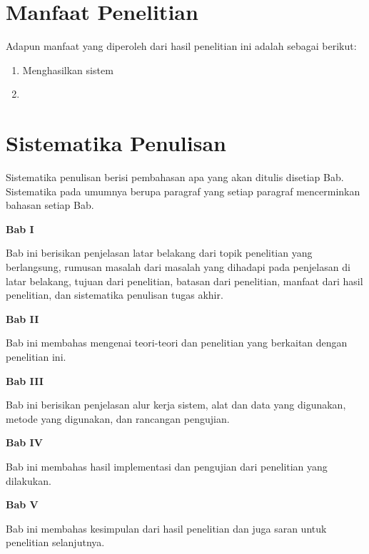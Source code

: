 \section{Manfaat Penelitian} \label{I.Manfaat}
Adapun manfaat yang diperoleh dari hasil penelitian ini adalah sebagai berikut: \par

\begin{enumerate}[noitemsep]
    \item Menghasilkan sistem 
    \item 
\end{enumerate}


\section{Sistematika Penulisan} \label{I.Sistematika}
Sistematika penulisan berisi pembahasan apa yang akan ditulis disetiap Bab. Sistematika pada umumnya berupa paragraf yang setiap paragraf mencerminkan bahasan setiap Bab. \par

\noindent\textbf{Bab I}

Bab ini berisikan penjelasan latar belakang dari topik penelitian yang berlangsung, rumusan masalah dari masalah yang dihadapi pada penjelasan di latar belakang, tujuan dari penelitian, batasan dari penelitian, manfaat dari hasil penelitian, dan sistematika penulisan tugas akhir. \par

\noindent\textbf{Bab II}

Bab ini membahas mengenai teori-teori dan penelitian yang berkaitan dengan penelitian ini.

\noindent\textbf{Bab III}

Bab ini berisikan penjelasan alur kerja sistem, alat dan data yang digunakan, metode yang digunakan, dan rancangan pengujian.

\noindent\textbf{Bab IV}

Bab ini membahas hasil implementasi dan pengujian dari penelitian yang dilakukan.

\noindent\textbf{Bab V}

Bab ini membahas kesimpulan dari hasil penelitian dan juga saran untuk penelitian selanjutnya.